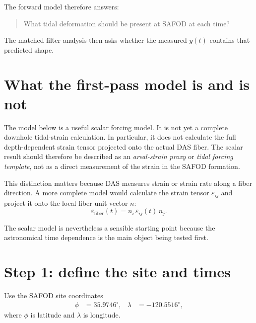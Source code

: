 \documentclass[11pt]{article}
\newcommand{\eps}{\varepsilon}
\begin{document}
The forward model therefore answers:

\begin{quote}
What tidal deformation should be present at SAFOD at each time?
\end{quote}

The matched-filter analysis then asks whether the measured $y(t)$ contains
that predicted shape.

\section{What the first-pass model is and is not}

The model below is a useful scalar forcing model.  It is not yet a complete
downhole tidal-strain calculation.  In particular, it does not calculate the
full depth-dependent strain tensor projected onto the actual DAS fiber.  The
scalar result should therefore be described as an \emph{areal-strain proxy} or
\emph{tidal forcing template}, not as a direct measurement of the strain in
the SAFOD formation.

This distinction matters because DAS measures strain or strain rate along a
fiber direction.  A more complete model would calculate the strain tensor
$\eps_{ij}$ and project it onto the local fiber unit vector $n$:
\begin{equation}
  \eps_{\mathrm{fiber}}(t) = n_i\,\eps_{ij}(t)\,n_j.
  \label{eq:fiber_projection}
\end{equation}

The scalar model is nevertheless a sensible starting point because the
astronomical time dependence is the main object being tested first.

\section{Step 1: define the site and times}

Use the SAFOD site coordinates
\begin{align}
  \phi &= 35.9746^\circ, &
  \lambda &= -120.5516^\circ,
\end{align}
where $\phi$ is latitude and $\lambda$ is longitude.
\end{document}
